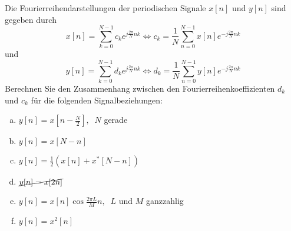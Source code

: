 \begin{uebsp}
\begin{Exercise}
    Die Fourierreihendarstellungen der periodischen Signale $x[n]$ und $y[n]$ sind gegeben durch
    \[x[n]=\sum_{k=0}^{N-1}c_ke^{j\frac{2\pi}{N}nk}\Leftrightarrow c_k=\frac{1}{N}\sum_{n=0}^{N-1}x[n]e^{-j\frac{2\pi}{N}nk}\]
    und 
    \[y[n]=\sum_{k=0}^{N-1}d_ke^{j\frac{2\pi}{N}nk}\Leftrightarrow d_k=\frac{1}{N}\sum_{n=0}^{N-1}y[n]e^{-j\frac{2\pi}{N}nk}\]
    Berechnen Sie den Zusammenhang zwischen den Fourierreihenkoeffizienten $d_k$ und $c_k$ für die folgenden Signalbeziehungen:
    \begin{enumerate}[a)]
        \item $y[n]=x\left[n-\frac{N}{2}\right],\;\;N$ gerade
        \item $y[n]=x\left[N-n\right]$
        \item $y[n]=\frac{1}{2}\left(x[n]+x^*\left[N-n\right]\right)$
        \item $\cancel{y[n]=x[2n]}$
        \item $y[n]=x[n]\cos\frac{2\pi L}{M}n,\;\;L$ und $M$ ganzzahlig
        \item $y[n]=x^2[n]$
    \end{enumerate}
\end{Exercise}
\begin{Answer}
\end{Answer}
\end{uebsp}
